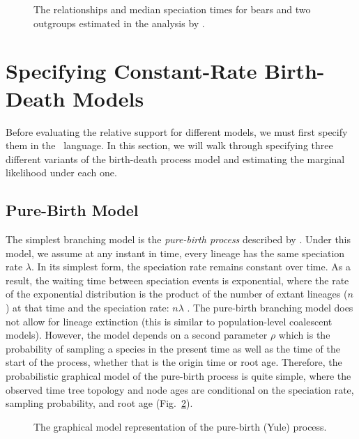 
\begin{figure}[h!]
\centering
{}
\caption{\small The relationships and median speciation times for bears and two outgroups estimated in the analysis by \citet{dosReis2012}.}
\label{bearTree}
\end{figure}

\bigskip
\section{Specifying Constant-Rate Birth-Death Models}\label{secModelSpec} 

Before evaluating the relative support for different models, we must first specify them in the \Rev~language.
In this section, we will walk through specifying three different variants of the birth-death process model and estimating the marginal likelihood under each one. 

\bigskip
\subsection{Pure-Birth Model}\label{yuleModSec}

The simplest branching model is the \textit{pure-birth process} described by \citet{yule24}. 
Under this model, we assume at any instant in time, every lineage has the same speciation rate $\lambda$.
In its simplest form, the speciation rate remains constant over time. 
As a result, the waiting time between speciation events is exponential, where the rate of the exponential distribution is the product of the number of extant lineages ($n$) at that time and the speciation rate: $n\lambda$ \citep{yule24,aldous01,hartmann10}. 
The pure-birth branching model does not allow for lineage extinction (this is similar to population-level coalescent models). 
However, the model depends on a second parameter $\rho$ which is the probability of sampling a species in the present time as well as the time of the start of the process, whether that is the origin time or root age.
Therefore, the probabilistic graphical model of the pure-birth process is quite simple, where the observed time tree topology and node ages are conditional on the speciation rate, sampling probability, and root age (Fig.~\ref{yuleGMfig}).
\begin{figure}[h!]
\centering
{}
\caption{\small The graphical model representation of the pure-birth (Yule) process.}
\label{yuleGMfig}
\end{figure}

